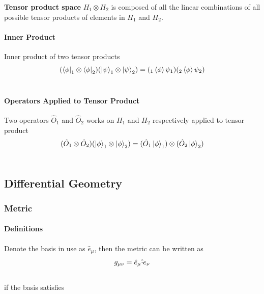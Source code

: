 \documentclass[letterpaper,10pt,english]{sphinxmanual}
\begin{document}
\textbf{Tensor product space} $H_1\otimes H_2$ is composed of all the linear combinations of all possible tensor products of elements in $H_1$ and $H_2$.


\paragraph{Inner Product}
\label{math:inner-product}
Inner product of two tensor products
\begin{gather}
\begin{split}(\bra{\phi}_1\otimes \bra{\phi}_2)(\ket{\psi}_1\otimes \ket{\psi}_2) = ( {} _ 1 \braket{\phi}{\psi}_1)({}_2\braket{\phi}{\psi}_2)\end{split}\notag\\\begin{split}\end{split}\notag
\end{gather}

\paragraph{Operators Applied to Tensor Product}
\label{math:operators-applied-to-tensor-product}
Two operators $\hat O_1$ and $\hat O_2$ works on $H_1$ and $H_2$ respectively applied to tensor product
\begin{gather}
\begin{split}(\hat O_1 \otimes \hat O_2 )( \ket{\phi}_1\otimes \ket{\phi}_2 ) = (\hat O_1 \ket{\phi}_1) \otimes (\hat O_2 \ket{\phi}_2)\end{split}\notag\\\begin{split}\end{split}\notag
\end{gather}

\subsection{Differential Geometry}
\label{math:differential-geometry}

\subsubsection{Metric}
\label{math:metric}

\paragraph{Definitions}
\label{math:definitions}
Denote the basis in use as $\hat e_\mu$, then the metric can be written as
\begin{gather}
\begin{split}g_{\mu\nu}=\hat e_\mu \hat \cdot e_\nu\end{split}\notag\\\begin{split}\end{split}\notag
\end{gather}
if the basis satisfies
\end{document}
